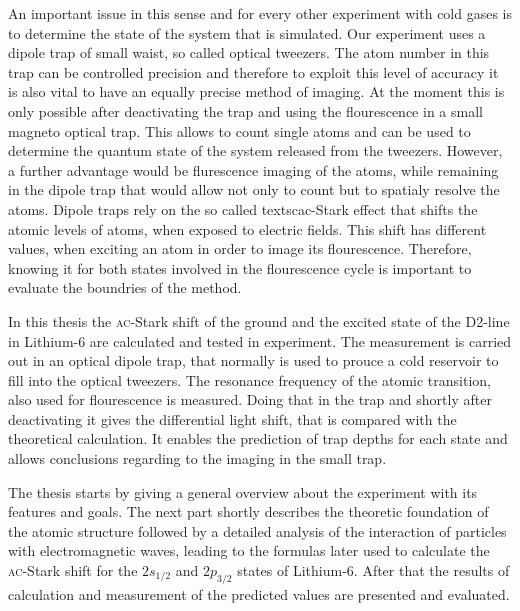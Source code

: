 An important issue in this sense and for every other experiment with cold gases is to determine the state of the system that is simulated. Our experiment uses a dipole trap of small waist, so called optical tweezers. The atom number in this trap can be controlled precision and therefore to exploit this level of accuracy it is also vital to have an equally precise method of imaging. At the moment this is only possible after deactivating the trap and using the flourescence in a small magneto optical trap. This allows to count single atoms and can be used to determine the quantum state of the system released from the tweezers. However, a further advantage would be flurescence imaging of the atoms, while remaining in the dipole trap that would allow not only to count but to spatialy resolve the atoms. Dipole traps rely on the so called textsc{ac}-Stark effect that shifts the atomic levels of atoms, when exposed to electric fields. This shift has different values, when exciting an atom in order to image its flourescence. Therefore, knowing it for both states involved in the flourescence cycle is important to evaluate the boundries of the method.

In this thesis the \textsc{ac}-Stark shift of the ground and the excited state of the D2-line in Lithium-6 are calculated and tested in experiment. The measurement is carried out in an optical dipole trap, that normally is used to prouce a cold reservoir to fill into the optical tweezers. The resonance frequency of the atomic transition, also used for flourescence is measured. Doing that in the trap and shortly after deactivating it gives the differential light shift, that is compared with the theoretical calculation. It enables the prediction of trap depths for each state and allows conclusions regarding to the imaging in the small trap. 

The thesis starts by giving a general overview about the experiment with its features and goals. The next part shortly describes the theoretic foundation of the atomic structure followed by a detailed analysis of the interaction of particles with electromagnetic waves, leading to the formulas later used to calculate the \textsc{ac}-Stark shift for the $2s_{1/2}$ and $2p_{3/2}$ states of Lithium-6. After that the results of calculation and measurement of the predicted values are presented and evaluated.


